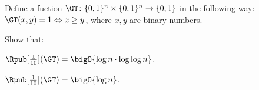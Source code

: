 Define a fuction $\GT\colon \{0, 1\}^n \times \{0, 1\}^n \to \{0, 1\}$ in the following way:
$\GT(x, y) = 1 \Leftrightarrow x \ge y$, where $x, y$ are binary numbers.

Show that:
\begin{enumlet}
    \item $\Rpub[\frac{1}{10}](\GT) = \bigO{\log n \cdot \log\log n}$.
    \item $\Rpub[\frac{1}{10}](\GT) = \bigO{\log n}$.
\end{enumlet}